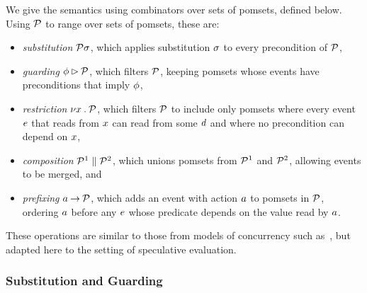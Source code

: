 We give the semantics using combinators over sets of pomsets, defined below.
Using $\mathcal{P}$ to range over sets of pomsets, these are:
\begin{itemize}
\item \emph{substitution} $\mathcal{P}\sigma$, which applies substitution $\sigma$ to
  every precondition of $\mathcal{P}$,
\item \emph{guarding} $\phi\mathbin\rhd\mathcal{P}$, which filters $\mathcal{P}$,
  keeping pomsets whose events have preconditions that imply $\phi$,
\item \emph{restriction} $\nu x\mathbin.\mathcal{P}$, which filters $\mathcal{P}$ to include
  only pomsets where every event $e$ that reads from $x$ can read from
  some $d$ and where no precondition can depend on $x$,
\item \emph{composition} $\mathcal{P}^1\parallel\mathcal{P}^2$, which unions pomsets from
  $\mathcal{P}^1$ and $\mathcal{P}^2$, allowing events to be merged, and
\item \emph{prefixing} $a\mathbin\rightarrow\mathcal{P}$, which adds an event with action
  $a$ to pomsets in $\mathcal{P}$, ordering $a$ before any $e$ whose predicate
  depends on the value read by $a$.
\end{itemize}
These operations are similar to those from models of concurrency such
as~\cite{Brookes:1984:TCS:828.833}, but adapted here to the setting of
speculative evaluation.



\subsubsection{Substitution and Guarding} 

